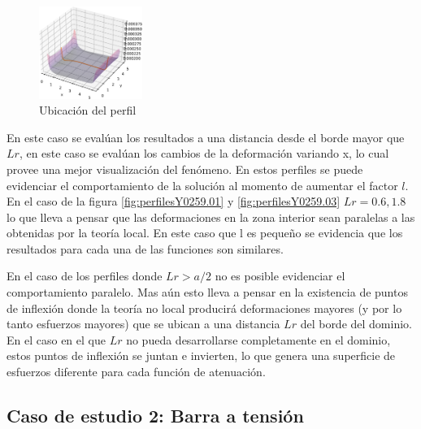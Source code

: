 	\begin{figure}
		\sffamily
		\begin{center}
			\includegraphics[width=0.3\textwidth]{figuras/Placa/defx_bonita_Y2.519.pdf}
		\end{center}
		\caption{Ubicación del perfil}
		\label{fig:defxbonitay2519}
	\end{figure}
	En este caso se evalúan los resultados a una distancia desde el borde mayor que $Lr$, en este caso se evalúan los cambios de la deformación variando x, lo cual provee una mejor visualización del fenómeno. En estos perfiles se puede evidenciar el comportamiento de la solución al momento de aumentar el factor $l$. En el caso de la figura \ref{fig:perfilesY0259.01} y \ref{fig:perfilesY0259.03} $Lr=0.6,1.8$ lo que lleva a pensar que las deformaciones en la zona interior sean paralelas a las obtenidas por la teoría local. En este caso que l es pequeño se evidencia que los resultados para cada una de las funciones son similares.

	En el caso de los perfiles donde $Lr>a/2$ no es posible evidenciar el comportamiento paralelo. Mas aún esto lleva a pensar en la existencia de puntos de inflexión donde la teoría no local producirá deformaciones mayores (y por lo tanto esfuerzos mayores) que se ubican a una distancia $Lr$ del borde del dominio. En el caso en el que $Lr$ no pueda desarrollarse completamente en el dominio, estos puntos de inflexión se juntan e invierten, lo que genera una superficie de esfuerzos diferente para cada función de atenuación.


\subsection{Caso de estudio 2: Barra a tensión}
